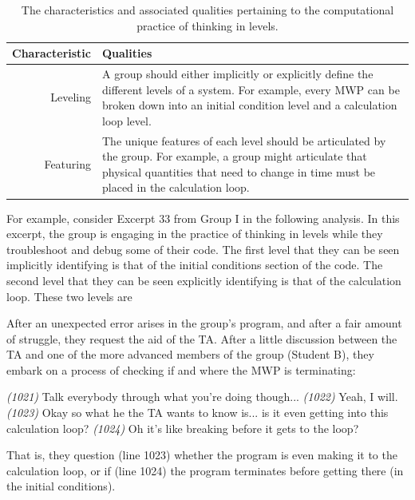 \documentclass{msuphddissertation}
\begin{document}
\begin{doublespace}
\begin{table}
\begin{tabular}{r|p{}}
Characteristic & Qualities \\\hline\hline
Leveling & A group should either implicitly or explicitly define the different levels of a system.  For example, every MWP can be broken down into an initial condition level and a calculation loop level.\\
Featuring & The unique features of each level should be articulated by the group.  For example, a group might articulate that physical quantities that need to change in time must be placed in the calculation loop.\\
\end{tabular}\caption{The characteristics and associated qualities pertaining to the computational practice of thinking in levels.}\label{CH5:ThinkingInLevels}
\end{table}

For example, consider Excerpt 33 from Group I in the following analysis.  In this excerpt, the group is engaging in the practice of thinking in levels while they troubleshoot and debug some of their code.  The first level that they can be seen implicitly identifying is that of the initial conditions section of the code.  The second level that they can be seen explicitly identifying is that of the calculation loop.  These two levels are 

After an unexpected error arises in the group's program, and after a fair amount of struggle, they request the aid of the TA.  After a little discussion between the TA and one of the more advanced members of the group (Student B), they embark on a process of checking if and where the MWP is terminating: \begin{description}
\TA \textit{(1021)} Talk everybody through what you're doing though...
\SB \textit{(1022)} Yeah, I will.
\SB \textit{(1023)} Okay so what he {the TA} wants to know is... is it even getting into this {calculation} loop?
\SD \textit{(1024)} Oh it's like breaking before it gets to the loop?
\end{description}  That is, they question (line 1023) whether the program is even making it to the calculation loop, or if (line 1024) the program terminates before getting there (in the initial conditions).


\end{doublespace}
\end{document}
